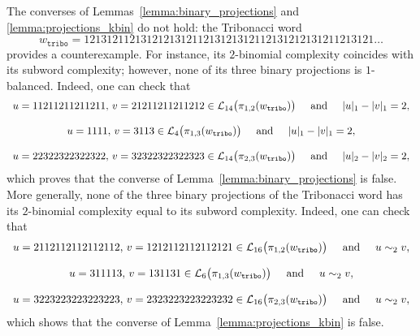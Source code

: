 \documentclass{template_arxiv}
\theoremstyle{definition}
\newcommand{\lan}{\mathcal{L}}
\begin{document}
The converses of Lemmas~\ref{lemma:binary_projections} and \ref{lemma:projections_kbin} do not hold: the Tribonacci word 
\[
    w_{\texttt{tribo}}=1213121 121312 1213121 1213 1213121 121312 1213121 1213121\ldots
\]
provides a counterexample. For instance, its $2$-binomial complexity coincides with its subword complexity; however, none of its three binary projections is $1$-balanced. Indeed, one can check that
\[
    \begin{array}{c}
        u=11211211211211,\,v=21211211211212\in\lan_{14}\big(\pi_{1,2}(w_{\texttt{tribo}})\big) \hspace{0.5cm} \text{and} \hspace{0.5cm} |u|_1-|v|_1=2,\\
        \\
        u=1111,\,v=3113\in\lan_{4}\big(\pi_{1,3}(w_{\texttt{tribo}})\big) \hspace{0.5cm} \text{and} \hspace{0.5cm} |u|_1-|v|_1=2,\\
        \\
        u=22322322322322,\,v=32322322322323\in\lan_{14}\big(\pi_{2,3}(w_{\texttt{tribo}})\big) \hspace{0.5cm} \text{and} \hspace{0.5cm} |u|_2-|v|_2=2,
    \end{array}
\]
which proves that the converse of Lemma~\ref{lemma:binary_projections} is false. More generally, none of the three binary projections of the Tribonacci word has its $2$-binomial complexity equal to its subword complexity. Indeed, one can check that
\[
    \begin{array}{c}
        u=2112112112112112,\,v=1212112112112121\in\lan_{16}\big(\pi_{1,2}(w_{\texttt{tribo}})\big) \hspace{0.5cm} \text{and} \hspace{0.5cm} u\sim_2 v,\\
        \\
        u=311113,\,v=131131\in\lan_{6}\big(\pi_{1,3}(w_{\texttt{tribo}})\big) \hspace{0.5cm} \text{and} \hspace{0.5cm} u\sim_2 v,\\
        \\
        u=3223223223223223,\,v=2323223223223232\in\lan_{16}\big(\pi_{2,3}(w_{\texttt{tribo}})\big) \hspace{0.5cm} \text{and} \hspace{0.5cm} u\sim_2 v,
    \end{array}
\]
which shows that the converse of Lemma~\ref{lemma:projections_kbin} is false.
\end{document}
